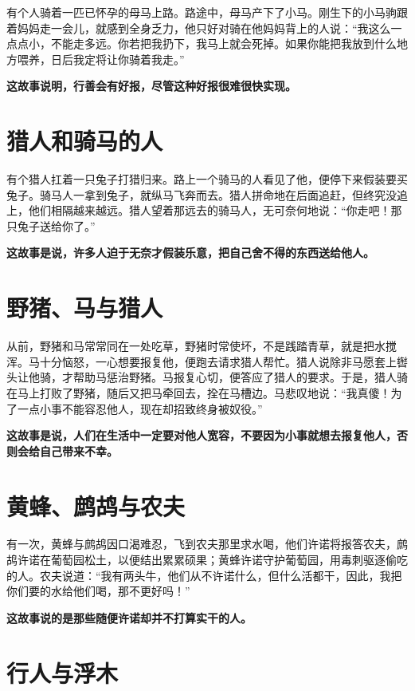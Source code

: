 有个人骑着一匹已怀孕的母马上路。路途中，母马产下了小马。刚生下的小马驹跟着妈妈走一会儿，就感到全身乏力，他只好对骑在他妈妈背上的人说：“我这么一点点小，不能走多远。你若把我扔下，我马上就会死掉。如果你能把我放到什么地方喂养，日后我定将让你骑着我走。”

{\bfseries \color{red}这故事说明，行善会有好报，尽管这种好报很难很快实现。}

\section{猎人和骑马的人}

有个猎人扛着一只兔子打猎归来。路上一个骑马的人看见了他，便停下来假装要买兔子。骑马人一拿到兔子，就纵马飞奔而去。猎人拼命地在后面追赶，但终究没追上，他们相隔越来越远。猎人望着那远去的骑马人，无可奈何地说：“你走吧！那只兔子送给你了。”

{\bfseries \color{red}这故事是说，许多人迫于无奈才假装乐意，把自己舍不得的东西送给他人。}

\section{野猪、马与猎人}

从前，野猪和马常常同在一处吃草，野猪时常使坏，不是践踏青草，就是把水搅浑。马十分恼怒，一心想要报复他，便跑去请求猎人帮忙。猎人说除非马愿套上辔头让他骑，才帮助马惩治野猪。马报复心切，便答应了猎人的要求。于是，猎人骑在马上打败了野猪，随后又把马牵回去，拴在马槽边。马悲叹地说：“我真傻！为了一点小事不能容忍他人，现在却招致终身被奴役。”

{\bfseries \color{red}这故事是说，人们在生活中一定要对他人宽容，不要因为小事就想去报复他人，否则会给自己带来不幸。}

\section{黄蜂、鹧鸪与农夫}

有一次，黄蜂与鹧鸪因口渴难忍，飞到农夫那里求水喝，他们许诺将报答农夫，鹧鸪许诺在葡萄园松土，以便结出累累硕果；黄蜂许诺守护葡萄园，用毒刺驱逐偷吃的人。农夫说道：“我有两头牛，他们从不许诺什么，但什么活都干，因此，我把你们要的水给他们喝，那不更好吗！”

{\bfseries \color{red}这故事说的是那些随便许诺却并不打算实干的人。}

\section{行人与浮木}

